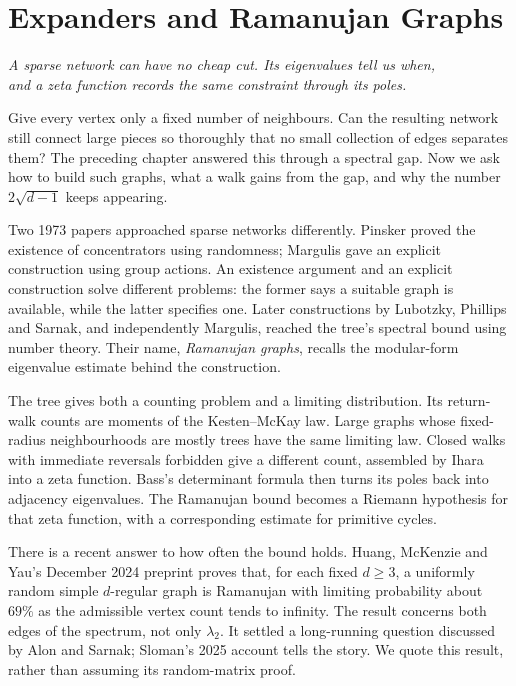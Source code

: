 \chapter{Expanders and Ramanujan Graphs}\label{ch:expanders}

\begin{center}\itshape
A sparse network can have no cheap cut. Its eigenvalues tell us when,\\
and a zeta function records the same constraint through its poles.
\end{center}

Give every vertex only a fixed number of neighbours. Can the resulting network still connect large pieces so thoroughly that no small collection of edges separates them? The preceding chapter answered this through a spectral gap. Now we ask how to build such graphs, what a walk gains from the gap, and why the number $2\sqrt{d-1}$ keeps appearing.

Two 1973 papers approached sparse networks differently. Pinsker proved the existence of concentrators using randomness; Margulis gave an explicit construction using group actions. An existence argument and an explicit construction solve different problems: the former says a suitable graph is available, while the latter specifies one. Later constructions by Lubotzky, Phillips and Sarnak, and independently Margulis, reached the tree's spectral bound using number theory. Their name, \emph{Ramanujan graphs}, recalls the modular-form eigenvalue estimate behind the construction.

The tree gives both a counting problem and a limiting distribution. Its return-walk counts are moments of the Kesten--McKay law. Large graphs whose fixed-radius neighbourhoods are mostly trees have the same limiting law. Closed walks with immediate reversals forbidden give a different count, assembled by Ihara into a zeta function. Bass's determinant formula then turns its poles back into adjacency eigenvalues. The Ramanujan bound becomes a Riemann hypothesis for that zeta function, with a corresponding estimate for primitive cycles.

There is a recent answer to how often the bound holds. Huang, McKenzie and Yau's December 2024 preprint proves that, for each fixed $d\ge3$, a uniformly random simple $d$-regular graph is Ramanujan with limiting probability about $69\%$ as the admissible vertex count tends to infinity. The result concerns both edges of the spectrum, not only $\lambda_2$. It settled a long-running question discussed by Alon and Sarnak; Sloman's 2025 account tells the story. We quote this result, rather than assuming its random-matrix proof.

